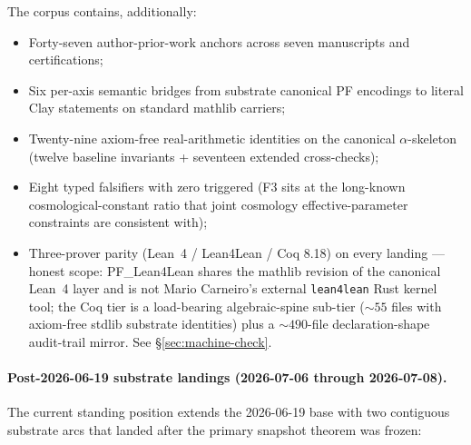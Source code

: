 \documentclass[11pt,a4paper]{amsart}
\theoremstyle{plain}
\theoremstyle{definition}
\begin{document}
The corpus contains, additionally:
\begin{itemize}[itemsep=2pt]
\item Forty-seven author-prior-work anchors across seven manuscripts and certifications;
\item Six per-axis semantic bridges from substrate canonical PF encodings to literal Clay statements on standard mathlib carriers;
\item Twenty-nine axiom-free real-arithmetic identities on the canonical $\alpha$-skeleton (twelve baseline invariants + seventeen extended cross-checks);
\item Eight typed falsifiers with zero triggered (F3 sits at the long-known cosmological-constant ratio that joint cosmology effective-parameter constraints are consistent with);
\item Three-prover parity (Lean~4 / Lean4Lean / Coq 8.18) on every landing --- honest scope: PF\_Lean4Lean shares the mathlib revision of the canonical Lean~4 layer and is not Mario Carneiro's external \texttt{lean4lean} Rust kernel tool; the Coq tier is a load-bearing algebraic-spine sub-tier ($\sim 55$ files with axiom-free stdlib substrate identities) plus a $\sim 490$-file declaration-shape audit-trail mirror. See \S\ref{sec:machine-check}.
\end{itemize}

\paragraph{Post-2026-06-19 substrate landings (2026-07-06 through 2026-07-08).} The current standing position extends the 2026-06-19 base with two contiguous substrate arcs that landed after the primary snapshot theorem was frozen:
\end{document}
